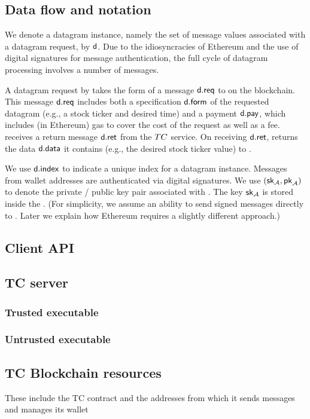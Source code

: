\subsection{Data flow and notation}

We denote a datagram instance, namely the set of message values associated with a datagram request, by ${\sf d}$. Due to the idiosyncracies of Ethereum and the use of digital signatures for message authentication, the full cycle of datagram processing involves a number of messages. 

A datagram request by \reqcont takes the form of a message ${\sf d.req}$ to \tcont on the blockchain. This message ${\sf d.req}$ includes both a specification ${\sf d.form}$ of the requested datagram (e.g., a stock ticker and desired time) and a payment ${\sf d.pay}$, which includes (in Ethereum) gas to cover the cost of the request as well as a fee. \tcont receives a return message ${\sf d.ret}$ from the $TC$ service. On receiving ${\sf d.ret}$, \tcont returns the data ${\sf d.data}$ it contains (e.g., the desired stock ticker value) to \reqcont. 

We use ${\sf d.index}$ to indicate a unique index for a datagram instance. Messages from wallet addresses are authenticated via digital signatures. We use $({{\sf sk}_{\cal A}}, {\sf pk}_{\cal A})$ to denote the private / public key pair associated with \tcadd. The key ${{\sf sk}_{\cal A}}$ is stored inside the \encname. (For simplicity, we assume an ability to send signed messages directly to \tcont. Later we explain how Ethereum requires a slightly different approach.)


\subsection{Client API}
\subsection{TC server}
\subsubsection{Trusted executable}
\subsubsection{Untrusted executable}
\subsection{TC Blockchain resources}
These include the TC contract and the addresses from which it sends messages and manages its wallet

